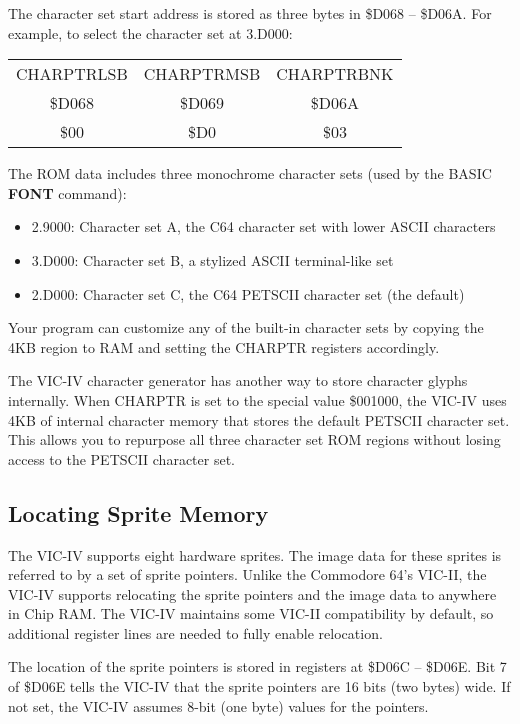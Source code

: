 The character set start address is stored as three bytes in \$D068 -- \$D06A.
For example, to select the character set at 3.D000:

\begin{center}
\begin{tabular}{|c|c|c|}
\hline
CHARPTRLSB & CHARPTRMSB & CHARPTRBNK \\
\$D068 & \$D069 & \$D06A \\
\hline
\$00 & \$D0 & \$03 \\
\hline
\end{tabular}
\end{center}

The ROM data includes three monochrome character sets (used by the BASIC {\bf
FONT} command):

\begin{itemize}
\item 2.9000: Character set A, the C64 character set with lower ASCII characters
\item 3.D000: Character set B, a stylized ASCII terminal-like set
\item 2.D000: Character set C, the C64 PETSCII character set (the default)
\end{itemize}

Your program can customize any of the built-in character sets by copying the
4KB region to RAM and setting the CHARPTR registers accordingly.

The VIC-IV character generator has another way to store character glyphs
internally. When CHARPTR is set to the special value \$001000, the VIC-IV uses
4KB of internal character memory that stores the default PETSCII character set. This
allows you to repurpose all three character set ROM regions without losing access
to the PETSCII character set.

\subsection{Locating Sprite Memory}

The VIC-IV supports eight hardware sprites. The image data for these sprites is
referred to by a set of sprite pointers. Unlike the Commodore 64's VIC-II, the
VIC-IV supports relocating the sprite pointers and the image data to anywhere
in Chip RAM. The VIC-IV maintains some VIC-II compatibility by default, so
additional register lines are needed to fully enable relocation.

The location of the sprite pointers is stored in registers at \$D06C -- \$D06E.
Bit 7 of \$D06E tells the VIC-IV that the sprite pointers are
16 bits (two bytes) wide. If not set, the VIC-IV assumes 8-bit (one byte)
values for the pointers.

